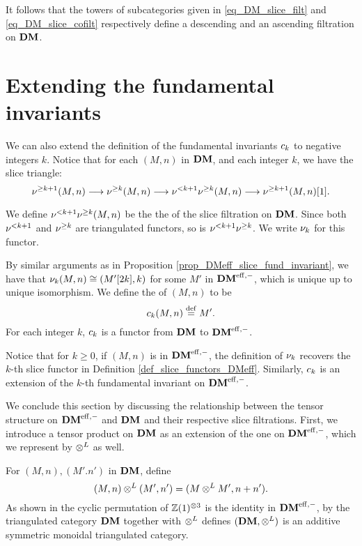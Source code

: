 It follows that the towers of subcategories given in 
\eqref{eq_DM_slice_filt} and \eqref{eq_DM_slice_cofilt} 
respectively define a descending and an ascending filtration on 
$\mathbf{DM}$.

\section{Extending the fundamental invariants}

We can also extend the definition of the fundamental invariants
$c_{k}$ to negative integers $k$. Notice that for each $(M, n)$
in $\mathbf{DM}$, and each integer $k$, we have the slice triangle:
\[
\nu^{\geq k + 1}(M, n) \longrightarrow \nu^{\geq k}(M, n) \longrightarrow \nu^{< k + 1}\nu^{\geq k}(M, n)
\longrightarrow \nu^{\geq k + 1}(M, n)[1].
\]

\begin{defn}
We define $\nu^{< k + 1}\nu^{\geq k}(M, n)$ be the the  of the slice filtration on $\mathbf{DM}$. Since both $\nu^{< k + 1}$ 
and $\nu^{\geq k}$ are triangulated functors, so is $\nu^{< k + 1}
\nu^{\geq k}$. We write $\nu_{k}$ for this functor. 

By similar arguments as in Proposition 
\ref{prop_DMeff_slice_fund_invariant}, we have that 
$\nu_{k}(M, n) \cong (M'[2k], k)$ for some $M'$ in $\mathbf{DM}^{\mathrm{eff},-}$,
which is unique up to unique isomorphism. We 
define the  of $(M, n)$ to be
\[
c_{k}(M, n) \stackrel{\mathrm{def}}{=} M'.
\]
For each integer $k$, $c_{k}$ is a functor from $\mathbf{DM}$ to
$\mathbf{DM}^{\mathrm{eff},-}$.

Notice that for $k \geq 0$, if $(M, n)$ is in $\mathbf{DM}^{\mathrm{eff},-}$, the 
definition of $\nu_{k}$ recovers the $k$-th slice functor
in Definition \ref{def_slice_functors_DMeff}. Similarly,
$c_{k}$ is an extension of the $k$-th fundamental invariant
on $\mathbf{DM}^{\mathrm{eff},-}$.
\end{defn}

We conclude this section by discussing the relationship between the
tensor structure on $\mathbf{DM}^{\mathrm{eff},-}$ and $\mathbf{DM}$ and their respective slice 
filtrations. First, we introduce a tensor product on $\mathbf{DM}$ as an 
extension of the one on $\mathbf{DM}^{\mathrm{eff},-}$, which we represent by $\otimes^L$ as
well.

For $(M, n), (M'. n')$ in $\mathbf{DM}$, define 
\[
(M, n) \otimes^L (M', n') = (M \otimes^L M', n + n'). 
\]
As shown in \cite[15.8]{MVW} the cyclic permutation of 
$\mathbb{Z}(1)^{\otimes 3}$ is the identity in $\mathbf{DM}^{\mathrm{eff},-}$, by 
\cite[8.4A12]{MVW} the triangulated category $\mathbf{DM}$ together with 
$\otimes^L$ defines $(\mathbf{DM}, \otimes^L)$ is an additive symmetric monoidal 
triangulated category.

